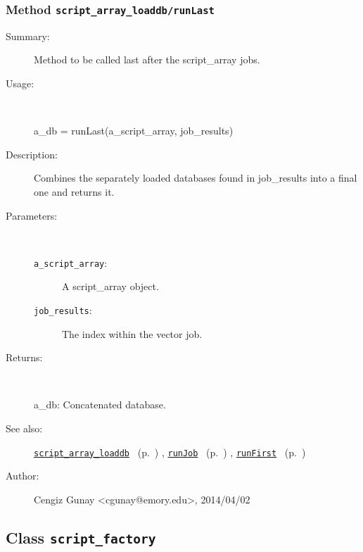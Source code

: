 \subsubsection[Method \texttt{runLast}]{Method \texttt{script\_array\_loaddb/runLast}}%
%
\label{ref_script_array_loaddb__runLast}%
\hypertarget{ref_script_array_loaddb__runLast}{}%
\begin{description}
\item[Summary:]Method to be called last after the script\_array jobs.
%
\item[Usage:]~%
\begin{lyxcode}%
a\_db = runLast(a\_script\_array, job\_results)
%
\end{lyxcode}%
%
\item[Description:]%
Combines the separately loaded databases found in job\_results into a
 final one and returns it.
\item[Parameters:]~
\begin{description}%
\item[\texttt{a\_script\_array}:]
 A script\_array object.
\item[\texttt{job\_results}:]
 The index within the vector job.
\end{description}%
%
\item[Returns:
]~

   a\_db: Concatenated database.
%
%
\item[See also:]%
\hyperlink{ref_script_array_loaddb}{\texttt{script\_array\_loaddb}}%
\ (p.~\pageref{ref_script_array_loaddb})%
%
, \hyperlink{ref_runJob}{\texttt{runJob}}%
\ (p.~\pageref{ref_runJob})%
%
, \hyperlink{ref_runFirst}{\texttt{runFirst}}%
\ (p.~\pageref{ref_runFirst})%
%
%
\item[Author:]%
Cengiz Gunay <cgunay@emory.edu>, 2014/04/02
%
\end{description}
\methodline%
\subsection{Class \texttt{script\_factory}}%
%
\label{ref_script_factory}%
\hypertarget{ref_script_factory}{}%
